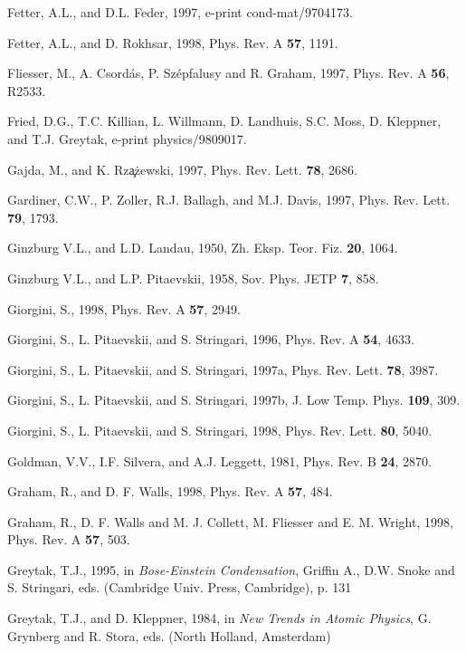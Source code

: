\begin{references}
   Fetter, A.L., and D.L. Feder, 1997, e-print
cond-mat/9704173.

   Fetter, A.L., and D. Rokhsar, 1998, Phys. Rev. A
{\bf 57}, 1191.

 Fliesser, M., A. Csord\'as, P. Sz\'epfalusy and R.
Graham, 1997, Phys. Rev. A {\bf 56}, R2533.

   Fried, D.G., T.C. Killian, L. Willmann, D. Landhuis,
S.C. Moss, D. Kleppner, and T.J. Greytak, e-print physics/9809017.

    Gajda, M., and K. Rz\c{a}\.{z}ewski, 1997, Phys.
Rev. Lett. {\bf 78}, 2686.

 Gardiner, C.W., P. Zoller, R.J. Ballagh, and M.J. 
Davis, 1997, Phys. Rev. Lett. {\bf 79}, 1793. 

 Ginzburg V.L., and L.D. Landau, 1950, Zh. Eksp.
Teor. Fiz. {\bf 20}, 1064.

 Ginzburg V.L., and L.P. Pitaevskii, 1958, Sov.
Phys. JETP {\bf 7}, 858.

 Giorgini, S., 1998, Phys. Rev. A {\bf 57}, 2949. 

 Giorgini, S., L. Pitaevskii, and S. Stringari,
1996, Phys. Rev. A {\bf 54}, 4633.

 Giorgini, S., L. Pitaevskii, and S. Stringari,
1997a, Phys. Rev. Lett. {\bf 78}, 3987.

 Giorgini, S., L. Pitaevskii, and S. Stringari,
1997b, J. Low Temp. Phys. {\bf 109}, 309.

 Giorgini, S., L. Pitaevskii, and S. Stringari,
1998, Phys. Rev. Lett. {\bf 80}, 5040. 

  Goldman, V.V., I.F. Silvera, and A.J. Leggett,
1981, Phys. Rev. B {\bf 24}, 2870.

  Graham, R., and D. F. Walls, 1998, Phys. Rev. A 
{\bf 57}, 484. 

  Graham, R., D. F. Walls and M. J. Collett, M.
Fliesser and E. M. Wright, 1998, Phys. Rev. A {\bf 57}, 503.

  Greytak, T.J., 1995, in {\it Bose-Einstein
Condensation}, Griffin A., D.W.  Snoke and S. Stringari, eds. (Cambridge
Univ.  Press, Cambridge), p. 131

  Greytak, T.J., and D. Kleppner, 1984, in {\it New
Trends in Atomic Physics}, G. Grynberg and R. Stora, eds. (North Holland,
Amsterdam)


\end{references}
